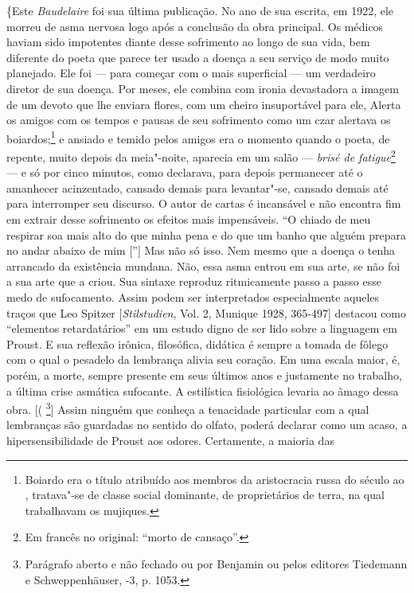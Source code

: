 \{Este \emph{Baudelaire} foi sua última publicação. No ano de sua
escrita, em 1922, ele morreu de asma nervosa logo após a conclusão da
obra principal. Os médicos haviam sido impotentes diante desse
sofrimento ao longo de sua vida, bem diferente do poeta que parece ter
usado a doença a seu serviço de modo muito planejado. Ele foi --- para
começar com o mais superficial --- um verdadeiro diretor de sua doença.
Por meses, ele combina com ironia devastadora a imagem de um devoto que
lhe enviara flores, com um cheiro insuportável para ele, Alerta os
amigos com os tempos e pausas de seu sofrimento como um czar alertava os
boiardos;\footnote{Boiardo era o título atribuído aos membros da
  aristocracia russa do século  ao , tratava"-se de classe social
  dominante, de proprietários de terra, na qual trabalhavam os mujiques. \versal{[N. E.]}}
e ansiado e temido pelos amigos era o momento quando o poeta, de
repente, muito depois da meia"-noite, aparecia em um salão --- \emph{brisé
de fatigue}\footnote{Em francês no original: ``morto de cansaço''. \versal{[N. T.]}}
--- e só por cinco minutos, como declarava, para depois permanecer até o
amanhecer acinzentado, cansado demais para levantar"-se, cansado demais
até para interromper seu discurso. O autor de cartas é incansável e não
encontra fim em extrair desse sofrimento os efeitos mais impensáveis. ``O
chiado de meu respirar soa mais alto do que minha pena e do que um banho
que alguém prepara no andar abaixo de mim {[}''{]} Mas não só isso. Nem
mesmo que a doença o tenha arrancado da existência mundana. Não, essa
asma entrou em sua arte, se não foi a sua arte que a criou. Sua sintaxe
reproduz ritmicamente passo a passo esse medo de sufocamento. Assim
podem ser interpretados especialmente aqueles traços que Leo Spitzer
{[}\emph{Stilstudien}, Vol. 2, Munique 1928, 365-497{]} destacou como
``elementos retardatários'' em um estudo digno de ser lido sobre a
linguagem em Proust. E sua reflexão irônica, filosófica, didática é
sempre a tomada de fôlego com o qual o pesadelo da lembrança alivia seu
coração. Em uma escala maior, é, porém, a morte, sempre presente em seus
últimos anos e justamente no trabalho, a última crise asmática
sufocante. A estilística fisiológica levaria ao âmago dessa obra. {[}(
\footnote{Parágrafo aberto e não fechado ou por Benjamin ou pelos
  editores Tiedemann e Schweppenhäuser, -3, p. 1053. \versal{[N. T.]}}{]} Assim
ninguém que conheça a tenacidade particular com a qual lembranças são
guardadas no sentido do olfato, poderá declarar como um acaso, a
hipersensibilidade de Proust aos odores. Certamente, a maioria das
